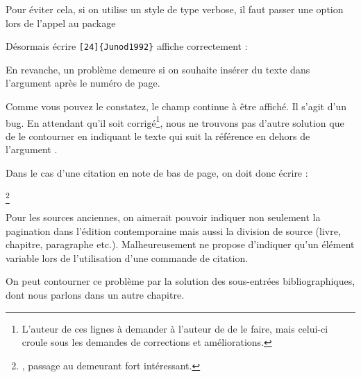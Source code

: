 \begin{quotation}
\cite[24]{Junod1992}
\end{quotation}



Pour éviter cela, si on utilise un style de type verbose, il faut passer une option lors de l'appel au package 

\begin{latexcode}
\usepackage[citestyle=verbose,citepages=omit]{biblatex}
\end{latexcode}

Désormais écrire \verb|[24]{Junod1992}|
affiche correctement :

\begin{quotation}
\cite[24]{Junod1992}
\end{quotation}

En revanche, un problème demeure si on souhaite insérer du texte dans l'argument  après le numéro de page.

\begin{latexcode}
\cite[\pno~24, passage au demeurant fort intéressant.]{Junod1992}
\end{latexcode}

\begin{quotation}
\cite[\pno~24, passage au demeurant fort intéressant.]{Junod1992}
\end{quotation}

Comme vous pouvez le constatez, le champ  continue à être affiché. Il s'agit d'un bug. En attendant qu'il soit corrigé\footnote{L'auteur de ces lignes à demander à l'auteur de  de le faire, mais celui-ci croule sous les demandes de corrections et améliorations.}, nous ne trouvons pas d'autre solution que de le contourner en indiquant le texte qui suit la référence en dehors de l'argument . 

Dans le cas d'une citation en note de bas de page, on doit donc écrire :

\begin{latexcode}
\footnote{\cite[24]{Junod1992}, passage au demeurant fort intéressant.}
\end{latexcode}

\begin{attention}
Pour les sources anciennes, on aimerait pouvoir indiquer non seulement la pagination dans l'édition contemporaine mais aussi la division de source (livre, chapitre, paragraphe etc.). Malheureusement  ne propose d'indiquer qu'un élément variable lors de l'utilisation d'une commande de citation.

On peut contourner ce problème par la solution des sous-entrées bibliographiques, dont nous parlons dans un autre chapitre. 
\end{attention}

